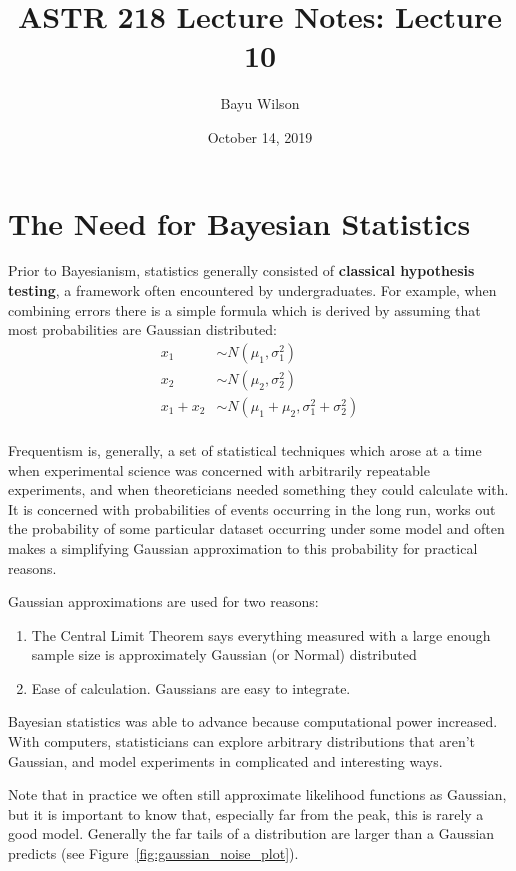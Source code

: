 \documentclass[12pt]{article}
\title{ASTR 218 Lecture Notes: Lecture 10}
\author{Bayu Wilson}
\date{October 14, 2019}
\begin{document}
\maketitle

\vspace{0.5in}


\section{The Need for Bayesian Statistics}
Prior to Bayesianism, statistics generally consisted of \textbf{classical hypothesis testing}, a framework often encountered by undergraduates. For example, when combining errors there is a simple formula which is derived by assuming that most probabilities are Gaussian distributed:
\begin{align*}
      x_1 & \sim  N(\mu_1,\sigma_1^2) \\
      x_2 & \sim  N(\mu_2,\sigma_2^2) \\
      x_1+x_2 &\sim  N(\mu_1+\mu_2,\sigma_1^2+\sigma_2^2) \\
\end{align*}

Frequentism is, generally, a set of statistical techniques which arose at a time when experimental science was concerned with arbitrarily repeatable experiments, and when theoreticians needed something they could calculate with. It is concerned with probabilities of events occurring in the long run, works out the probability of some particular dataset occurring under some model and often makes a simplifying Gaussian approximation to this probability for practical reasons. 

Gaussian approximations are used for two reasons:
\begin{enumerate}
  \item The Central Limit Theorem says everything measured with a large enough sample size is approximately Gaussian (or Normal) distributed
  \item Ease of calculation. Gaussians are easy to integrate.
\end{enumerate}

Bayesian statistics was able to advance because computational power increased. With computers, statisticians can explore arbitrary distributions that aren't Gaussian, and model experiments in complicated and interesting ways.

Note that in practice we often still approximate likelihood functions as Gaussian, but it is important to know that, especially far from the peak, this is rarely a good model. Generally the far tails of a distribution are larger than a Gaussian predicts (see Figure~\ref{fig:gaussian_noise_plot}).
\end{document}
